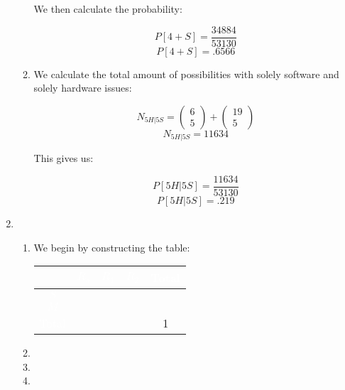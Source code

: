 \begin{enumerate}
\begin{enumerate}
        We then calculate the probability:

        $$P[4+S]=\frac{34884}{53130}$$
        $$\boxed{P[4+S]=.6566}$$

      \item We calculate the total amount of possibilities with solely software and solely hardware issues:

        $$N_{5H|5S}=\left( \begin{matrix} 6\\ 5\end{matrix} \right)+\left( \begin{matrix} 19\\ 5\end{matrix} \right)$$
        $$N_{5H|5S}=11634$$

        This gives us:
        
        $$P[5H|5S]=\frac{11634}{53130}$$
        $$\boxed{P[5H|5S]=.219}$$

    \end{enumerate}

  \item

    \begin{enumerate}

      \item We begin by constructing the table:

    \begin{center}
      \begin{tabular}[H]{|c|c|c|c|c|}
        \hline
        \rowcolor{black!60} \cellcolor{white} & \textcolor{white}{$R_o$} & \textcolor{white}{$R_1$} & \textcolor{white}{$R_2$} & \textcolor{white}{Total}\\
        \hline
        \cellcolor{black!60} \textcolor{white}{$S$} & & & & \\
        \hline
        \cellcolor{black!60} \textcolor{white}{$M$} & & & &\\
        \hline
        \cellcolor{black!60} \textcolor{white}{Total} & & & & 1\\
        \hline
      \end{tabular}
    \end{center}

      \item 

      \item 

      \item 

    \end{enumerate}


\end{enumerate}
